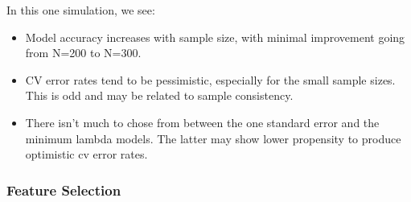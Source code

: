 \documentclass[
]{book}
\begin{document}
In this one simulation, we see:

\begin{itemize}
\item
  Model accuracy increases with sample size, with minimal improvement going from N=200 to N=300.
\item
  CV error rates tend to be pessimistic, especially for the small sample sizes. This is odd
  and may be related to sample consistency.
\item
  There isn't much to chose from between the one standard error and the minimum lambda models. The
  latter may show lower propensity to produce optimistic cv error rates.
\end{itemize}

\hypertarget{feature-selection}{%
\subsubsection{Feature Selection}\label{feature-selection}}
\end{document}
